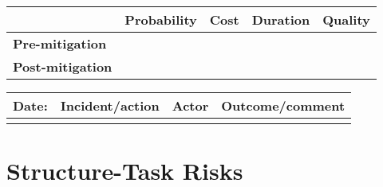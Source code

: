 \begin{table}
\begin{tabularx}{\textwidth}{| l | l | X | X | X |}
		\hline
		 &  \textbf{Probability} & \textbf{Cost} & \textbf{Duration} & \textbf{Quality} \\ \hline
		\textbf{Pre-mitigation} &  &  &  &  \\ \hline
		\textbf{Post-mitigation} &  &  &  &  \\ \hline \hline
	\end{tabularx}
	\begin{tabularx}{\textwidth}{| l | X | l | X |}
		\hline
		\textbf{Date:} & \textbf{Incident/action} & \textbf{Actor} & \textbf{Outcome/comment} \\ \hline
		 &  &  &  \\ \hline
	\end{tabularx}%
\end{table}

\FloatBarrier

\section{Structure-Task Risks}
\label{Structure-Task_Risks}

\FloatBarrier

